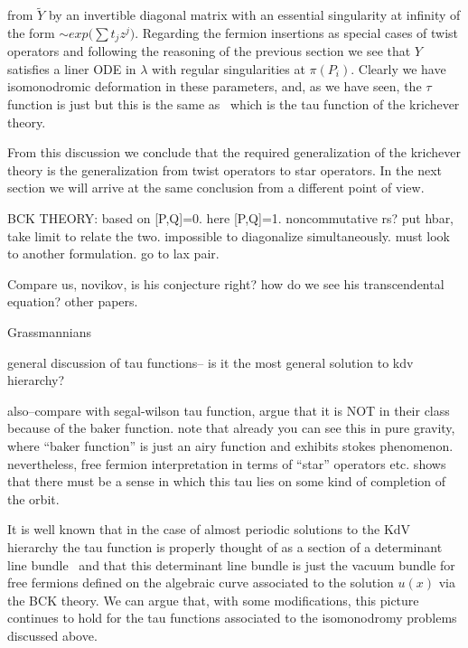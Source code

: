 from $\tilde Y$ by an invertible 
diagonal matrix with an essential singularity
at infinity of the form $\sim exp\bigl(\sum t_j z^j\bigr)$.
Regarding the fermion insertions as special cases of twist operators
and following the reasoning of the previous section we see that 
$Y$ satisfies a liner ODE in $\lambda$ with regular singularities
at $\pi(P_i)$. Clearly we have isomonodromic deformation in 
these parameters, and, as we have seen, the $\tau$ function is 
just
\eqn{}
but this is the same as \qpti\ which is the tau function of 
the krichever theory.

From this discussion we conclude that the required generalization of 
the krichever theory is the generalization from twist operators 
to star operators. In the next section we will arrive at the 
same conclusion from a different point of view.


BCK THEORY: based on [P,Q]=0. here [P,Q]=1. noncommutative rs?
put hbar, take limit to relate the two.
impossible to diagonalize simultaneously. must look to another 
formulation. go to lax pair. 

Compare us, novikov, is his conjecture right? how do we
see his transcendental equation? other papers.


{\subsec Grassmannians}

general discussion of tau functions-- is it the most
general solution to kdv hierarchy?

also--compare with segal-wilson tau function, argue that it 
is NOT in their class because of the baker function. 
note that already you can see this in pure gravity, 
where ``baker function'' is just an airy function and 
exhibits stokes phenomenon. nevertheless, free fermion 
interpretation in terms of ``star'' operators etc. shows
that there must be a sense in which this tau lies on 
some kind of completion of the orbit.



It is well known that in the case of almost periodic solutions to 
the KdV hierarchy the tau function is properly thought of as a 
section of a determinant line bundle \segal\ 
and that this determinant line bundle is just the vacuum 
bundle for free fermions defined on the algebraic curve associated to 
the solution $u(x)$ via the BCK theory.
We can argue that, with some modifications, 
this picture continues to hold
for the tau functions associated to the isomonodromy problems 
discussed above.

